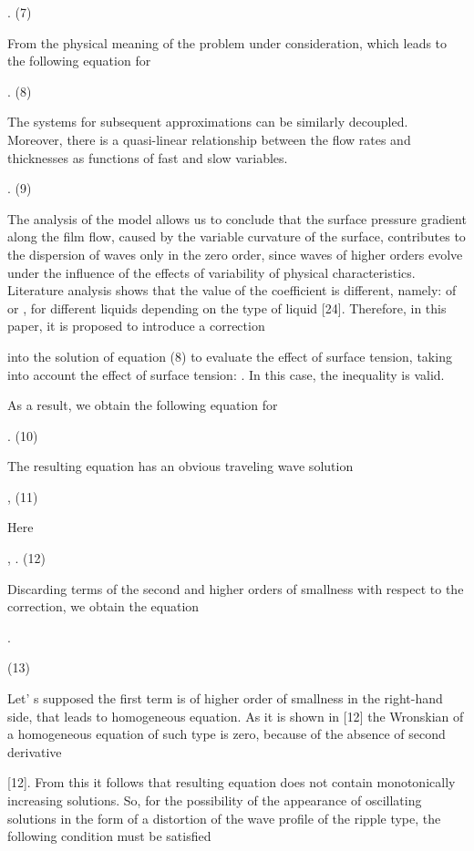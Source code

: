 \begin{multicols}{2}
.
(7)

From the physical meaning of the problem under
consideration,
which leads to the following equation
for

.
(8)

The systems for subsequent approximations can be similarly decoupled.
Moreover, there is a quasi-linear relationship between the flow rates
and thicknesses as functions of fast and slow variables.

.
(9)

The analysis of the model allows us to conclude that the surface
pressure gradient along the film flow, caused by the variable curvature
of the surface, contributes to the dispersion of waves only in the zero
order, since waves of higher orders evolve under the influence of the
effects of variability of physical characteristics. Literature analysis
shows that the value of the coefficient
is
different, namely:
of
or ,
for different liquids depending on the type of liquid {[}24{]}.
Therefore, in this paper, it is proposed to introduce a correction

into the solution of equation (8) to evaluate the effect of surface
tension, taking into account the effect of surface tension:
.
In this case, the inequality
is
valid.

As a result, we obtain the following equation for


.
(10)

The resulting equation has an obvious traveling wave solution

,
(11)

Here

,
.
(12)

Discarding terms of the second and higher orders of smallness with
respect to the
correction,
we obtain the equation



.

(13)

Let' s supposed the first term is of higher order of
smallness in the right-hand side, that leads to homogeneous equation. As
it is shown in {[}12{]} the Wronskian of a homogeneous equation of such
type is zero, because of the absence of second derivative

{[}12{]}. From this it follows that resulting equation does not contain
monotonically increasing solutions. So, for the possibility of the
appearance of oscillating solutions in the form of a distortion of the
wave profile of the ripple type, the following condition must be
satisfied



\end{multicols}

